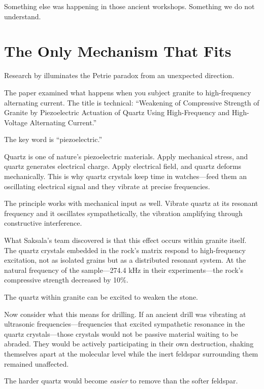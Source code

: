 \documentclass[11pt]{article}
\begin{document}
Something else was happening in those ancient workshops. Something we do not understand.

\section{The Only Mechanism That Fits}

Research by \citet{Saksala2023} illuminates the Petrie paradox from an unexpected direction.

The paper examined what happens when you subject granite to high-frequency alternating current. The title is technical: ``Weakening of Compressive Strength of Granite by Piezoelectric Actuation of Quartz Using High-Frequency and High-Voltage Alternating Current.''

The key word is ``piezoelectric.''

Quartz is one of nature's piezoelectric materials. Apply mechanical stress, and quartz generates electrical charge. Apply electrical field, and quartz deforms mechanically. This is why quartz crystals keep time in watches---feed them an oscillating electrical signal and they vibrate at precise frequencies.

The principle works with mechanical input as well. Vibrate quartz at its resonant frequency and it oscillates sympathetically, the vibration amplifying through constructive interference.

What Saksala's team discovered is that this effect occurs within granite itself. The quartz crystals embedded in the rock's matrix respond to high-frequency excitation, not as isolated grains but as a distributed resonant system. At the natural frequency of the sample---274.4 kHz in their experiments---the rock's compressive strength decreased by 10\%.

The quartz within granite can be excited to weaken the stone.

Now consider what this means for drilling. If an ancient drill was vibrating at ultrasonic frequencies---frequencies that excited sympathetic resonance in the quartz crystals---those crystals would not be passive material waiting to be abraded. They would be actively participating in their own destruction, shaking themselves apart at the molecular level while the inert feldspar surrounding them remained unaffected.

The harder quartz would become \textit{easier} to remove than the softer feldspar.
\end{document}
